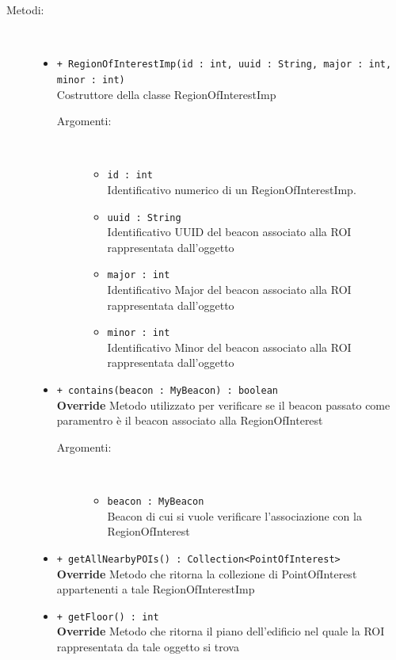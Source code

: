 \documentclass[../DefinizioneDiProdotto.tex]{subfiles}
\begin{document}
\begin{description}
\begin{itemize}
	\end{itemize}
	\item[Metodi:] \
	\begin{itemize}
		\item \texttt{+ RegionOfInterestImp(id  : int, uuid : String, major : int, minor : int)}\\
		Costruttore della classe RegionOfInterestImp
		\begin{description}
			\item[Argomenti:] \
			\begin{itemize}
				\item \texttt{id  : int}\\
				Identificativo numerico di un RegionOfInterestImp.\item \texttt{uuid : String}\\
				Identificativo UUID del beacon associato alla ROI rappresentata dall'oggetto\item \texttt{major : int}\\
				Identificativo Major del beacon associato alla ROI rappresentata dall'oggetto\item \texttt{minor : int}\\
				Identificativo Minor del beacon associato alla ROI rappresentata dall'oggetto\end{itemize}
		\end{description}
		\item \texttt{+ contains(beacon : MyBeacon) : boolean}\\
		\textbf{Override} Metodo utilizzato per verificare se il beacon passato come paramentro è il beacon associato alla RegionOfInterest
		\begin{description}
			\item[Argomenti:] \
			\begin{itemize}
				\item \texttt{beacon : MyBeacon}\\
				Beacon di cui si vuole verificare l'associazione con la RegionOfInterest\end{itemize}
		\end{description}
		\item \texttt{+ getAllNearbyPOIs() : Collection<PointOfInterest>}\\
		\textbf{Override} Metodo che ritorna la collezione di PointOfInterest appartenenti a tale RegionOfInterestImp
		\item \texttt{+ getFloor() : int}\\
		\textbf{Override} Metodo che ritorna il piano dell'edificio nel quale la ROI rappresentata da tale oggetto si trova

\end{itemize}
\end{description}
\end{document}
